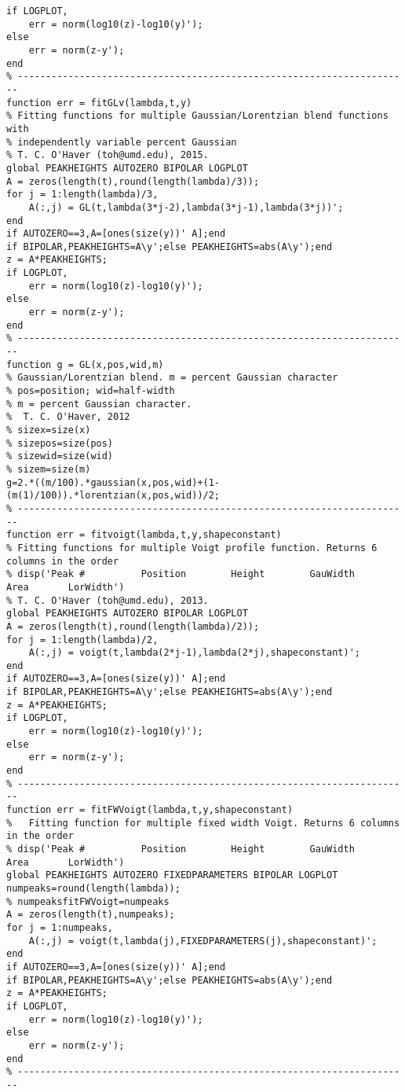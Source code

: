 \begin{lstlisting}
if LOGPLOT,
    err = norm(log10(z)-log10(y)');
else
    err = norm(z-y');
end
% ----------------------------------------------------------------------
function err = fitGLv(lambda,t,y)
% Fitting functions for multiple Gaussian/Lorentzian blend functions with
% independently variable percent Gaussian
% T. C. O'Haver (toh@umd.edu), 2015.
global PEAKHEIGHTS AUTOZERO BIPOLAR LOGPLOT
A = zeros(length(t),round(length(lambda)/3));
for j = 1:length(lambda)/3,
    A(:,j) = GL(t,lambda(3*j-2),lambda(3*j-1),lambda(3*j))';
end
if AUTOZERO==3,A=[ones(size(y))' A];end
if BIPOLAR,PEAKHEIGHTS=A\y';else PEAKHEIGHTS=abs(A\y');end
z = A*PEAKHEIGHTS;
if LOGPLOT,
    err = norm(log10(z)-log10(y)');
else
    err = norm(z-y');
end
% ----------------------------------------------------------------------
function g = GL(x,pos,wid,m)
% Gaussian/Lorentzian blend. m = percent Gaussian character
% pos=position; wid=half-width
% m = percent Gaussian character.
%  T. C. O'Haver, 2012
% sizex=size(x)
% sizepos=size(pos)
% sizewid=size(wid)
% sizem=size(m)
g=2.*((m/100).*gaussian(x,pos,wid)+(1-(m(1)/100)).*lorentzian(x,pos,wid))/2;
% ----------------------------------------------------------------------
function err = fitvoigt(lambda,t,y,shapeconstant)
% Fitting functions for multiple Voigt profile function. Returns 6 columns in the order
% disp('Peak #          Position        Height        GauWidth          Area       LorWidth')
% T. C. O'Haver (toh@umd.edu), 2013.
global PEAKHEIGHTS AUTOZERO BIPOLAR LOGPLOT
A = zeros(length(t),round(length(lambda)/2));
for j = 1:length(lambda)/2,
    A(:,j) = voigt(t,lambda(2*j-1),lambda(2*j),shapeconstant)';
end
if AUTOZERO==3,A=[ones(size(y))' A];end
if BIPOLAR,PEAKHEIGHTS=A\y';else PEAKHEIGHTS=abs(A\y');end
z = A*PEAKHEIGHTS;
if LOGPLOT,
    err = norm(log10(z)-log10(y)');
else
    err = norm(z-y');
end
% ----------------------------------------------------------------------
function err = fitFWVoigt(lambda,t,y,shapeconstant)
%	Fitting function for multiple fixed width Voigt. Returns 6 columns in the order
% disp('Peak #          Position        Height        GauWidth          Area       LorWidth')
global PEAKHEIGHTS AUTOZERO FIXEDPARAMETERS BIPOLAR LOGPLOT
numpeaks=round(length(lambda));
% numpeaksfitFWVoigt=numpeaks
A = zeros(length(t),numpeaks);
for j = 1:numpeaks,
    A(:,j) = voigt(t,lambda(j),FIXEDPARAMETERS(j),shapeconstant)';
end
if AUTOZERO==3,A=[ones(size(y))' A];end
if BIPOLAR,PEAKHEIGHTS=A\y';else PEAKHEIGHTS=abs(A\y');end
z = A*PEAKHEIGHTS;
if LOGPLOT,
    err = norm(log10(z)-log10(y)');
else
    err = norm(z-y');
end
% ----------------------------------------------------------------------

\end{lstlisting}
